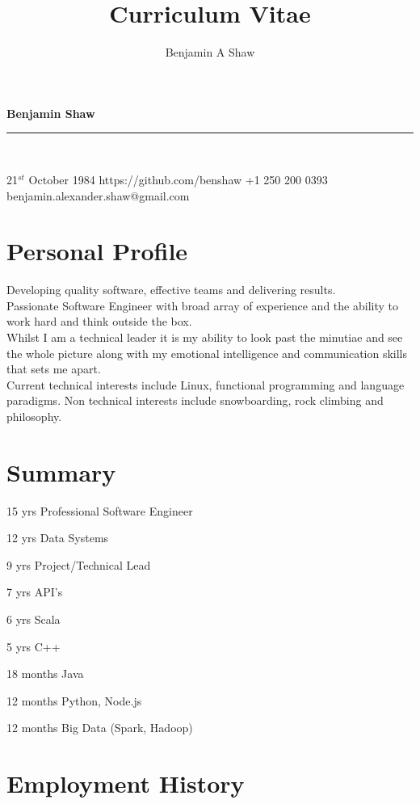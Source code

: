 \documentclass{article}
\title{Curriculum Vitae}
\author{Benjamin A Shaw}
\begin{document}
{\huge{\color{slateblue}\textbf{Benjamin Shaw}}}\\
\rule{\textwidth}{0.5mm}\\

\begin{personaldetails}
{21$^{st}$ October 1984}
{https://github.com/benshaw}
{+1 250 200 0393}
{benjamin.alexander.shaw@gmail.com}
\end{personaldetails}


\section*{Personal Profile}
\begin{profile}
Developing quality software, effective teams and delivering results. \\
Passionate Software Engineer with broad array of experience and the ability to work hard and think outside the box. \\
Whilst I am a technical leader it is my ability to look past the minutiae and see the whole picture along with my emotional intelligence and communication skills that sets me apart. \\
Current technical interests include Linux, functional programming and language paradigms. Non technical interests include snowboarding, rock climbing and philosophy.
\end{profile}

\section*{Summary}
\begin{itemize-spaced}
  \item 15 yrs Professional Software Engineer
  \item 12 yrs Data Systems  
  \item 9 yrs Project/Technical Lead
  \item 7 yrs API's
  \item 6 yrs Scala 
  \item 5 yrs C++
  \item 18 months Java
  \item 12 months Python, Node.js
  \item 12 months Big Data (Spark, Hadoop)
\end{itemize-spaced}

\section*{Employment History}
\end{document}
